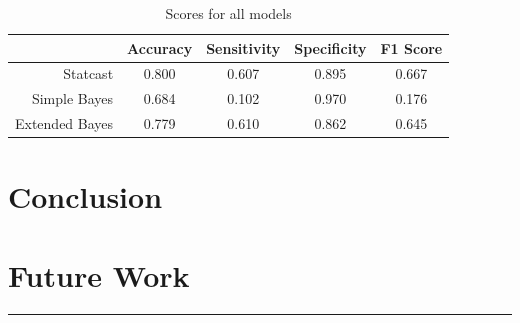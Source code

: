 \documentclass[12pt,letterpaper]{article}
\begin{document}
\begin{table}[!htb]
    \centering
    \begin{tabular}{|r|c|c|c|c|}
        \hline
        & Accuracy & Sensitivity & Specificity & F1 Score \\ \hline
        Statcast & 0.800 & 0.607 & 0.895 & 0.667 \\ \hline
        Simple Bayes & 0.684 & 0.102 & 0.970 & 0.176 \\ \hline
        Extended Bayes & 0.779 & 0.610 & 0.862 & 0.645 \\ \hline
    \end{tabular}
    \caption{Scores for all models}
    \label{tab:results_acc}
\end{table}

\section*{Conclusion}

\section*{Future Work}

\noindent\rule{\textwidth}{1pt}
\printendnotes
\end{document}
